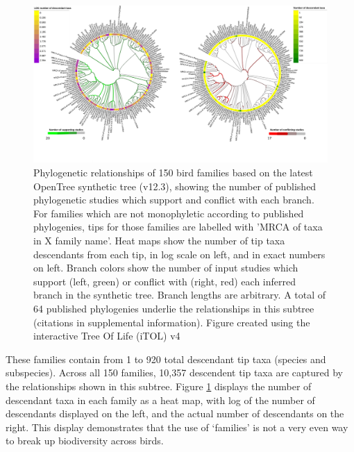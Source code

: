 \documentclass[oupdraft]{sysbio_sse}
\begin{document}
\begin{figure}[!h]
\centering\includegraphics[width=\textwidth]{bird_fam_fig}

\caption{Phylogenetic relationships of 150 bird families based on the latest OpenTree synthetic tree (v12.3), showing the number of published phylogenetic studies which support and conflict with each branch. For families which are not monophyletic according to published phylogenies, tips for those families are labelled with 'MRCA of taxa in X family name'. Heat maps show the number of tip taxa descendants from each tip, in log scale on left, and in exact numbers on left. Branch colors show the number of input studies which support (left, green) or conflict with (right, red) each inferred branch in the synthetic tree. Branch lengths are arbitrary. A total of 64 published phylogenies underlie the relationships in this subtree (citations in supplemental information). Figure created using the interactive Tree Of Life (iTOL) v4 \citep{letunic_interactive_2019}}
\label{birdfams}
\end{figure}

These families contain from 1 to 920 total descendant tip taxa (species and subspecies).
Across all 150 families, 10,357 descendent tip taxa are captured by the relationships shown in this subtree.
Figure \ref{birdfams} displays the number of descendant taxa in each family as a heat map, with log of the number of descendants displayed on the left, and the actual number of descendants on the right.
This display demonstrates that the use of `families' is not a very even way to break up biodiversity across birds.
\end{document}
